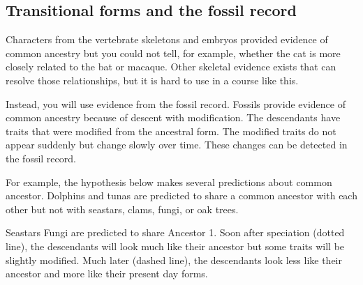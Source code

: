 \documentclass[12pt, hidelinks]{exam}
\begin{document}
\subsection*{Transitional forms and the fossil record}%



%		
%
Characters from the vertebrate skeletons and embryos provided evidence of common 
ancestry but you could not tell, for example, whether the cat is more closely related to the bat or macaque. 
Other skeletal evidence exists
that can resolve those relationships, but it is hard to use in a course like this.

Instead, you will use evidence from the fossil record. Fossils provide evidence of common ancestry because of descent with modification. The descendants have traits that were modified from the ancestral form. The modified traits do not appear suddenly but change slowly over time. These changes can be detected in the fossil record.%

For example, the hypothesis below makes several predictions about common ancestor. Dolphins and tunas are predicted to share a common ancestor with each other but not with seastars, clams, fungi, or oak trees.  

Seastars Fungi are predicted to share Ancestor 1. Soon after speciation (dotted line), the descendants will look much like their ancestor but some traits will be slightly modified. Much later (dashed line), the descendants look less like their ancestor and more like their present day forms. 
\end{document}
